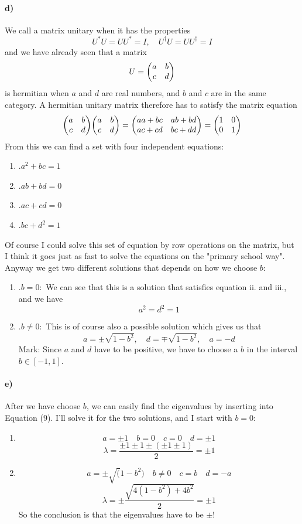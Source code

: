 \documentclass{scrartcl}
\begin{document}
\paragraph{d)}
We call a matrix unitary when it has the properties 
\begin{equation*}
U^*U=UU^*=I,\quad U^\dagger U=UU^\dagger=I
\end{equation*}
and we have already seen that a matrix 
$$U=\mqty(a & b \\ c & d)$$
is hermitian when $a$ and $d$ are real numbers, and $b$ and $c$ are in the same category. A hermitian unitary matrix therefore has to satisfy the matrix equation
$$\mqty(a & b \\ c & d)\mqty(a & b \\ c & d)=\mqty(aa + bc & ab + bd \\ ac + cd & bc + dd)=\mqty(\imat{2})$$
From this we can find a set with four independent equations:
\renewcommand{\labelenumi}{\roman{enumi}}
\begin{enumerate}
\item .\quad $a^2+bc=1$
\item .\quad $ab+bd=0$
\item .\quad $ac+cd=0$
\item .\quad $bc+d^2=1$
\end{enumerate}
Of course I could solve this set of equation by row operations on the matrix, but I think it goes just as fast to solve the equations on the "primary school way". Anyway we get two different solutions that depends on how we choose $b$:
\renewcommand{\labelenumi}{\roman{enumi}}
\begin{enumerate}
\item .\quad $b=0:$
We can see that this is a solution that satisfies equation ii. and iii., and we have
$$a^2=d^2=1$$ 
\item .\quad $b\neq 0:$
This is of course also a possible solution which gives us that 
$$a=\pm\sqrt{1-b^2},\quad d=\mp\sqrt{1-b^2},\quad a=-d$$
Mark: Since $a$ and $d$ have to be positive, we have to choose a $b$ in the interval $b\in[-1,1]$.
\end{enumerate}
\paragraph{e)}
After we have choose $b$, we can easily find the eigenvalues by inserting into Equation (9). I'll solve it for the two solutions, and I start with $b=0$:
\renewcommand{\labelenumi}{\Roman{enumi}}
\begin{enumerate}
\item $$a=\pm1 \quad b=0\quad c=0\quad d=\pm1$$
$$\lambda=\frac{\pm1\pm1\pm(\pm1\pm1)}{2}=\pm1$$
\item $$a=\pm\sqrt(1-b^2)\quad b\neq0 \quad c=b \quad d=-a$$
$$\lambda=\pm\frac{\sqrt{4(1-b^2)+4b^2}}{2}=\pm1$$
So the conclusion is that the eigenvalues have to be $\pm$!
\end{enumerate}
\end{document}
